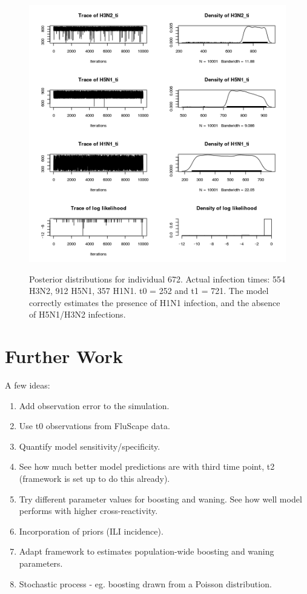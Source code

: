 \documentclass[a4paper,11pt,twoside]{article}
\begin{document}
\begin{figure}[H]
\begin{centering}
\includegraphics[scale=0.8]{672_mcmc.png}\\
\caption{Posterior distributions for individual 672. Actual infection times: 554 H3N2, 912 H5N1, 357 H1N1. t0 = 252 and t1 = 721. The model correctly estimates the presence of H1N1 infection, and the absence of H5N1/H3N2 infections.}
\end{centering}
\end{figure}

\newpage

\section{Further Work}
A few ideas:
\begin{enumerate}
\item Add observation error to the simulation.
\item Use t0 observations from FluScape data.
\item Quantify model sensitivity/specificity.
\item See how much better model predictions are with third time point, t2 (framework is set up to do this already).
\item Try different parameter values for boosting and waning. See how well model performs with higher cross-reactivity.
\item Incorporation of priors (ILI incidence).
\item Adapt framework to estimates population-wide boosting and waning parameters.
\item Stochastic process - eg. boosting drawn from a Poisson distribution.
\end{enumerate}
\end{document}
